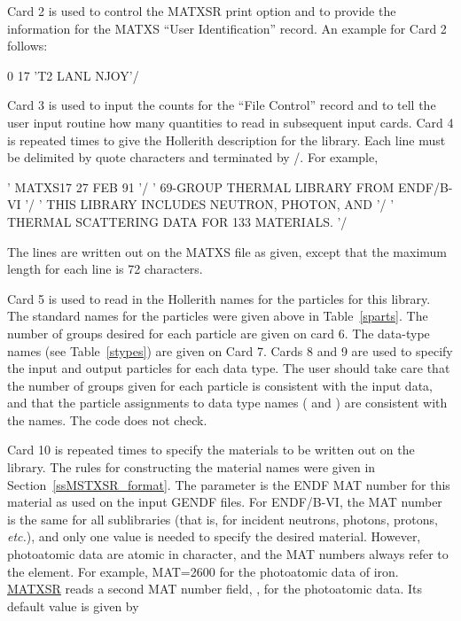 Card 2 is used to control the MATXSR
print option 
and to provide the information for the MATXS ``User Identification''
record.  An example for Card 2 follows:

\small
\begin{ccode}

  0  17  'T2 LANL NJOY'/

\end{ccode}
\normalsize

\noindent
Card 3 is used to input the counts for the ``File Control'' record and
to tell the user input routine how many quantities to read in subsequent
input cards.  Card 4 is repeated  times to give the Hollerith
description for the library.  Each line must be delimited by quote
characters and terminated by /.  For example,

\small
\begin{ccode}

 ' MATXS17                                27 FEB 91 '/
 ' 69-GROUP THERMAL LIBRARY FROM ENDF/B-VI          '/
 '   THIS LIBRARY INCLUDES NEUTRON, PHOTON, AND     '/
 '   THERMAL SCATTERING DATA FOR 133 MATERIALS.     '/

\end{ccode}
\normalsize

\noindent
The lines are written out on the MATXS file as given, except that
the maximum length for each line is 72 characters.

Card 5 is used to read in the Hollerith names for the 
particles for this library.  The standard names for the particles
were given above in Table~\ref{sparts}.  The number of groups desired
for each particle are given on card 6.  The data-type names (see
Table~\ref{stypes}) are given on Card 7.  Cards 8 and 9 are used to specify
the input and output particles for each data type.  The user
should take care that the number of groups given for each particle
is consistent with the input data, and that the particle assignments
to data type names ( and ) are consistent
with the  names.  The code does not check.

Card 10 is repeated  times to specify the materials
to be written out on the library.  The rules for constructing the
material names  were given in Section~\ref{ssMSTXSR_format}.  The
 parameter is the ENDF MAT number for this material
as used on the input GENDF files.  For ENDF/B-VI, the MAT number
is the same for all sublibraries (that is, for incident neutrons,
photons, protons, {\it etc.}), and only one value is needed to specify the
desired material.  However, photoatomic data are
atomic in character, and the MAT numbers always refer to the
element.  For example, MAT=2600 for the photoatomic data of
iron.  \hyperlink{sMATXSRhy}{MATXSR} reads a
second MAT number field, ,
for the photoatomic data.  Its default value is given by

